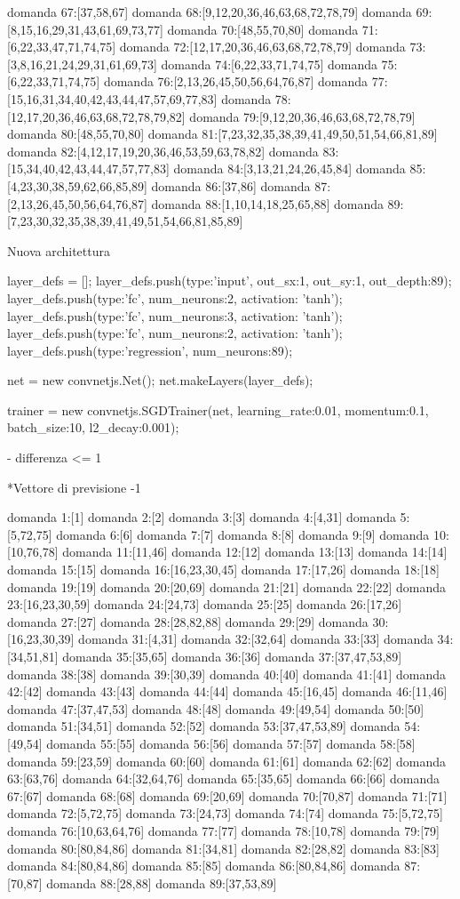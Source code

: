 domanda 67:[37,58,67]
domanda 68:[9,12,20,36,46,63,68,72,78,79]
domanda 69:[8,15,16,29,31,43,61,69,73,77]
domanda 70:[48,55,70,80]
domanda 71:[6,22,33,47,71,74,75]
domanda 72:[12,17,20,36,46,63,68,72,78,79]
domanda 73:[3,8,16,21,24,29,31,61,69,73]
domanda 74:[6,22,33,71,74,75]
domanda 75:[6,22,33,71,74,75]
domanda 76:[2,13,26,45,50,56,64,76,87]
domanda 77:[15,16,31,34,40,42,43,44,47,57,69,77,83]
domanda 78:[12,17,20,36,46,63,68,72,78,79,82]
domanda 79:[9,12,20,36,46,63,68,72,78,79]
domanda 80:[48,55,70,80]
domanda 81:[7,23,32,35,38,39,41,49,50,51,54,66,81,89]
domanda 82:[4,12,17,19,20,36,46,53,59,63,78,82]
domanda 83:[15,34,40,42,43,44,47,57,77,83]
domanda 84:[3,13,21,24,26,45,84]
domanda 85:[4,23,30,38,59,62,66,85,89]
domanda 86:[37,86]
domanda 87:[2,13,26,45,50,56,64,76,87]
domanda 88:[1,10,14,18,25,65,88]
domanda 89:[7,23,30,32,35,38,39,41,49,51,54,66,81,85,89]


Nuova architettura

layer_defs = [];
layer_defs.push({type:'input', out_sx:1, out_sy:1, out_depth:89});
layer_defs.push({type:'fc', num_neurons:2, activation: 'tanh'});
layer_defs.push({type:'fc', num_neurons:3, activation: 'tanh'});
layer_defs.push({type:'fc', num_neurons:2, activation: 'tanh'});
layer_defs.push({type:'regression', num_neurons:89});

net = new convnetjs.Net();
net.makeLayers(layer_defs);

trainer = new convnetjs.SGDTrainer(net, {learning_rate:0.01, momentum:0.1, batch_size:10, l2_decay:0.001});

- differenza <= 1

*Vettore di previsione -1

domanda 1:[1]
domanda 2:[2]
domanda 3:[3]
domanda 4:[4,31]
domanda 5:[5,72,75]
domanda 6:[6]
domanda 7:[7]
domanda 8:[8]
domanda 9:[9]
domanda 10:[10,76,78]
domanda 11:[11,46]
domanda 12:[12]
domanda 13:[13]
domanda 14:[14]
domanda 15:[15]
domanda 16:[16,23,30,45]
domanda 17:[17,26]
domanda 18:[18]
domanda 19:[19]
domanda 20:[20,69]
domanda 21:[21]
domanda 22:[22]
domanda 23:[16,23,30,59]
domanda 24:[24,73]
domanda 25:[25]
domanda 26:[17,26]
domanda 27:[27]
domanda 28:[28,82,88]
domanda 29:[29]
domanda 30:[16,23,30,39]
domanda 31:[4,31]
domanda 32:[32,64]
domanda 33:[33]
domanda 34:[34,51,81]
domanda 35:[35,65]
domanda 36:[36]
domanda 37:[37,47,53,89]
domanda 38:[38]
domanda 39:[30,39]
domanda 40:[40]
domanda 41:[41]
domanda 42:[42]
domanda 43:[43]
domanda 44:[44]
domanda 45:[16,45]
domanda 46:[11,46]
domanda 47:[37,47,53]
domanda 48:[48]
domanda 49:[49,54]
domanda 50:[50]
domanda 51:[34,51]
domanda 52:[52]
domanda 53:[37,47,53,89]
domanda 54:[49,54]
domanda 55:[55]
domanda 56:[56]
domanda 57:[57]
domanda 58:[58]
domanda 59:[23,59]
domanda 60:[60]
domanda 61:[61]
domanda 62:[62]
domanda 63:[63,76]
domanda 64:[32,64,76]
domanda 65:[35,65]
domanda 66:[66]
domanda 67:[67]
domanda 68:[68]
domanda 69:[20,69]
domanda 70:[70,87]
domanda 71:[71]
domanda 72:[5,72,75]
domanda 73:[24,73]
domanda 74:[74]
domanda 75:[5,72,75]
domanda 76:[10,63,64,76]
domanda 77:[77]
domanda 78:[10,78]
domanda 79:[79]
domanda 80:[80,84,86]
domanda 81:[34,81]
domanda 82:[28,82]
domanda 83:[83]
domanda 84:[80,84,86]
domanda 85:[85]
domanda 86:[80,84,86]
domanda 87:[70,87]
domanda 88:[28,88]
domanda 89:[37,53,89]


